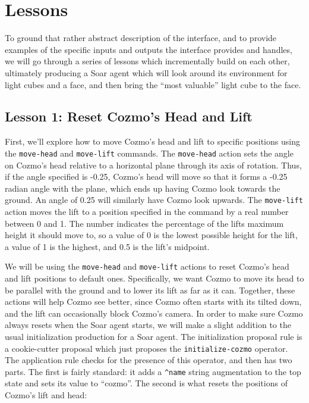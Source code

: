 \hypertarget{lessons}{%
\section{Lessons}\label{lessons}}

To ground that rather abstract description of the interface, and to
provide examples of the specific inputs and outputs the interface
provides and handles, we will go through a series of lessons which
incrementally build on each other, ultimately producing a Soar agent
which will look around its environment for light cubes and a face, and
then bring the ``most valuable'' light cube to the face.

\hypertarget{lesson-1-reset-cozmos-head-and-lift}{%
\subsection{Lesson 1: Reset Cozmo's Head and
Lift}\label{lesson-1-reset-cozmos-head-and-lift}}

First, we'll explore how to move Cozmo's head and lift to specific
positions using the \texttt{move-head} and \texttt{move-lift} commands.
The \texttt{move-head} action sets the angle on Cozmo's head relative to
a horizontal plane through its axis of rotation. Thus, if the angle
specified is -0.25, Cozmo's head will move so that it forms a -0.25
radian angle with the plane, which ends up having Cozmo look towards the
ground. An angle of 0.25 will similarly have Cozmo look upwards. The
\texttt{move-lift} action moves the lift to a position specified in the
command by a real number between 0 and 1. The number indicates the
percentage of the lifts maximum height it should move to, so a value of
0 is the lowest possible height for the lift, a value of 1 is the
highest, and 0.5 is the lift's midpoint.

We will be using the \texttt{move-head} and \texttt{move-lift} actions
to reset Cozmo's head and lift positions to default ones. Specifically,
we want Cozmo to move its head to be parallel with the ground and to
lower its lift as far as it can. Together, these actions will help Cozmo
see better, since Cozmo often starts with its tilted down, and the lift
can occasionally block Cozmo's camera. In order to make sure Cozmo
always resets when the Soar agent starts, we will make a slight addition
to the usual initialization production for a Soar agent. The
initialization proposal rule is a cookie-cutter proposal which just
proposes the \texttt{initialize-cozmo} operator. The application rule
checks for the presence of this operator, and then has two parts. The
first is fairly standard: it adds a \texttt{\^{}name} string
augmentation to the top state and sets its value to ``cozmo''. The
second is what resets the positions of Cozmo's lift and head:

